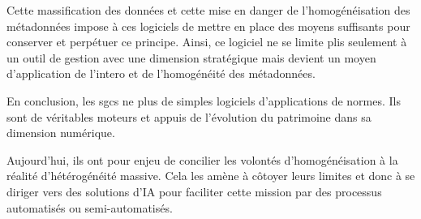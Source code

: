 Cette massification des données et cette mise en danger de l'homogénéisation des métadonnées impose à ces logiciels de mettre en place des moyens suffisants pour conserver et perpétuer ce principe. Ainsi, ce logiciel ne se limite plis seulement à un outil de gestion avec une dimension stratégique mais devient un moyen d'application de l'\gls{intero} et de l'homogénéité des métadonnées.

En conclusion, les \glspl{sgc} ne plus de simples logiciels d'applications de normes. Ils sont de véritables moteurs et appuis de l'évolution du patrimoine dans sa dimension numérique. 

Aujourd'hui, ils ont pour enjeu de concilier les volontés d'homogénéisation à la réalité d'hétérogénéité massive. Cela les amène à côtoyer leurs limites et donc à se diriger vers des solutions d'\gls{IA} pour faciliter cette mission par des processus automatisés ou semi-automatisés. 